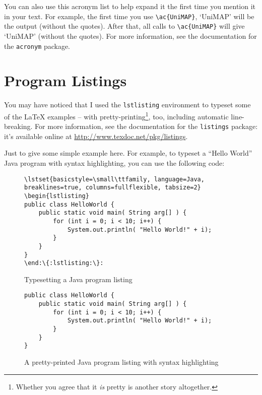 You can also use this acronym list to help expand it the first time you mention it in your text.  For example, the first time you use \verb|\ac{UniMAP}|, `\ac{UniMAP}' will be the output (without the quotes).  After that, all calls to \verb|\ac{UniMAP}| will give `\ac{UniMAP}' (without the quotes).  For more information, see the documentation for the \texttt{acronym} package.

\section{Program Listings}

You may have noticed that I used the \verb|lstlisting| environment to typeset some of the \LaTeX{} examples -- with pretty-printing\footnote{Whether you agree that it \emph{is} pretty is another story altogether.}, too, including automatic line-breaking.  For more information, see the documentation for the \verb|listings| package: it's available online at \url{http://www.texdoc.net/pkg/listings}.

Just to give some simple example here.  For example, to typeset a ``Hello World'' Java program with syntax highlighting, you can use the following code:

\begin{figure}[hbt!]
\begin{lstlisting}[escapechar=:,language={}]
\lstset{basicstyle=\small\ttfamily, language=Java, breaklines=true, columns=fullflexible, tabsize=2}
\begin{lstlisting}
public class HelloWorld {
	public static void main( String arg[] ) {
        for (int i = 0; i < 10; i++) {
			System.out.println( "Hello World!" + i);
		}
	}
}
\end:\{:lstlisting:\}:
\end{lstlisting}
\caption{Typesetting a Java program listing}\label{fig:lst:syntax}
\end{figure}

\begin{figure}[hbt!]
\lstset{basicstyle=\small\ttfamily, language=Java, breaklines=true, columns=fullflexible, framesep=10pt, xleftmargin=16pt, tabsize=2}
\begin{lstlisting}
public class HelloWorld {
	public static void main( String arg[] ) {
        for (int i = 0; i < 10; i++) {
			System.out.println( "Hello World!" + i);
		}
	}
}
\end{lstlisting}
\caption{A pretty-printed Java program listing with syntax highlighting}
\end{figure}



